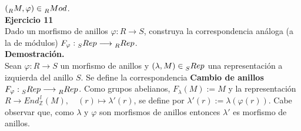 \documentclass{article}
\newcommand{\Z}{\mathbb{Z}}
\theoremstyle{definition}
\theoremstyle{plain}
\theoremstyle{plain}
\theoremstyle{definition}
\theoremstyle{definition}
\theoremstyle{definition}
\theoremstyle{definition}
\theoremstyle{definition}
\theoremstyle{definition}
\begin{document}
 $(\prescript{}{R}{M},\varphi)\in  \prescript{}{R}{Mod}$.\\
 
\textbf{Ejercicio 11} \\

Dado un morfismo de anillos $\varphi:R\to S$, construya la correspondencia análoga (a la de módulos) 
$F_\varphi:\prescript{}{S}{Rep}\longrightarrow \prescript{}{R}{Rep}$.\\

\textbf{Demostración.}\\
Sean $\varphi:R\to S$ un morfismo de anillos y $(\lambda,M)\in \prescript{}{S}{Rep}$ una representación a izquierda del anillo
$S$. Se define la correspondencia \textbf{Cambio de anillos}\\
 $F_\varphi:\prescript{}{S}{Rep}\longrightarrow \prescript{}{R}{Rep}$. Como grupos abelianos, $F_\lambda(M):= M$ y
 la representación $R\to End_{\Z}^{\,l}(M),\quad (r)\longmapsto \lambda'(r)$, se define por  $\lambda'(r):=\lambda(\varphi(r))$.
 Cabe observar que, como $\lambda$ y $\varphi$ son  morfismos de anillos entonces $\lambda'$ es morfismo de anillos.
\end{document}
